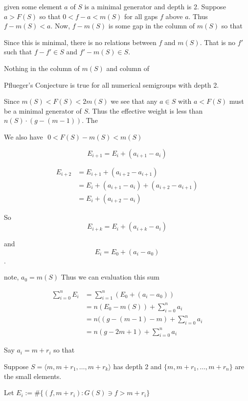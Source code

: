 \documentclass[11pt]{article}
\begin{document}
given some element \(a\) of \(S\) is a minimal generator and depth is 2. Suppose \(a > F(S)\) so that \(0 < f - a < m(S)\) for all gaps \(f\) above \(a\). Thus \(f - m(S) < a\). Now, \(f - m(S)\) is some gap in the column of \(m(S)\) so that 

Since this is minimal, there is no relations between \(f\) and \(m(S)\). That is no \(f'\) such that \(f - f' \in S\) and \(f' - m(S) \in S\).

Nothing in the column of \(m(S)\) and column of 

\begin{proposition}
    Pflueger's Conjecture is true for all numerical semigroups with depth 2.
\end{proposition}

Since \(m(S) < F(S) < 2m(S)\) we see that any \(a \in S\) with \(a < F(S)\) must be a minimal generator of \(S\). Thus the effective weight is less than \(n(S) \cdot (g - (m - 1))\). The 

We also have \(\) \(0 < F(S) - m(S) < m(S)\)

\[E_{i+1} = E_{i} + (a_{i+1} - a_{i})\]


\begin{align*}
    E_{i + 2} &= E_{i+1} + (a_{i+2} - a_{i+1}) \\
    &= E_{i} + (a_{i+1} - a_{i}) +  (a_{i+2} - a_{i+1})  \\
    &= E_i + (a_{i+2} - a_{i})
\end{align*}

So \[E_{i + k} = E_{i} + (a_{i+k} - a_i)\]

and \[E_{i} = E_0 + (a_i - a_0)\].

note, \(a_0 = m(S)\)
Thus we can evaluation this sum

\begin{align*}
    \sum\limits_{i=0}^{n} E_i &= \sum\limits_{i=1}^n (E_0 + (a_i - a_0)) \\
    &= n (E_0 - m(S)) + \sum\limits_{i=0}^n a_i \\
    &= n ((g - (m-1) - m) + \sum\limits_{i=0}^n a_i \\
    &= n (g - 2m + 1) + \sum\limits_{i=0}^n a_i
\end{align*}

Say \(a_i = m + r_i\) so that 

Suppose \(S = \langle m, m + r_1, \dots, m + r_k \rangle\) has depth 2 and \(\{m, m + r_1, \dots, m + r_n\}\) are the small elements.

Let \(E_i := \# \{(f, m + r_i) : G(S) \ni f > m + r_i\}\)
\end{document}
